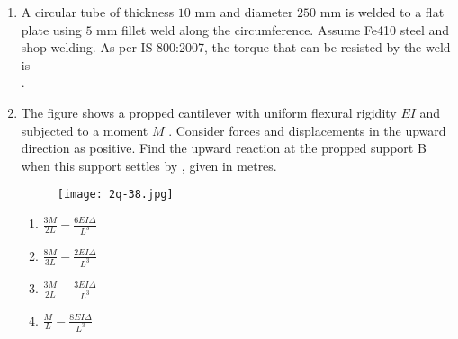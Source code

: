\documentclass[journal,12pt,onecolumn]{article}
\theoremstyle{remark}
\begin{document}
\begin{enumerate}
    \hfill{}
    \begin{enumerate}
    \end{enumerate}

    \item A circular tube of thickness $10$ mm and diameter $250$ mm is welded to a flat plate using $5$ mm fillet weld along the circumference. Assume Fe410 steel and shop welding.
    As per IS 800:2007, the torque that can be resisted by the weld  is \underline{\hspace{2cm}} \\ .

    \hfill{}
    \begin{enumerate}
    \end{enumerate}

    \item The figure  shows a propped cantilever with uniform flexural rigidity $EI$  and subjected to a moment $M$ . Consider forces and displacements in the upward direction as positive.
    Find the upward reaction at the propped support B  when this support settles by \brak{-\Delta}, given in metres.
    \begin{figure}[H]
        \centering
        \texttt{[image: 2q-38.jpg]}
        \caption{}
        \label{fig:q38}
    \end{figure}

    \hfill{}
    \begin{enumerate}
        \item $\frac{3M}{2L} - \frac{6EI\Delta}{L^3}$
        \item $\frac{8M}{3L} - \frac{2EI\Delta}{L^3}$
        \item $\frac{3M}{2L} - \frac{3EI\Delta}{L^3}$
        \item $\frac{M}{L} - \frac{8EI\Delta}{L^3}$
    \end{enumerate}


\end{enumerate}
\end{document}
